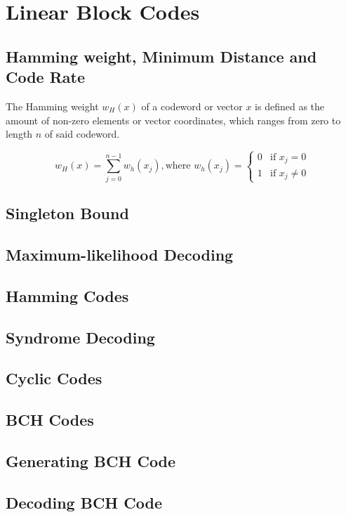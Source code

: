 \documentclass[../main.tex]{subfiles}
\begin{document}
    \chapter{Linear Block Codes}

    \section{Hamming weight, Minimum Distance and Code Rate}
    The Hamming weight $w_H(x)$ of a codeword or vector $x$ is defined as the amount of non-zero elements or vector coordinates, which ranges from zero to length $n$ of said codeword.

    \begin{equation*}
        w_H(x) = \sum_{j=0}^{n-1} w_h(x_j), \text{where } w_h(x_j) = \begin{cases} 0 &\text{if } x_j = 0 \\ 1 &\text{if } x_j \neq 0 \end{cases}
    \end{equation*}


    \section{Singleton Bound}


    \section{Maximum-likelihood Decoding}


    \section{Hamming Codes}


    \section{Syndrome Decoding}


    \section{Cyclic Codes}


    \section{BCH Codes}


    \section{Generating BCH Code}


    \section{Decoding BCH Code}
\end{document}
